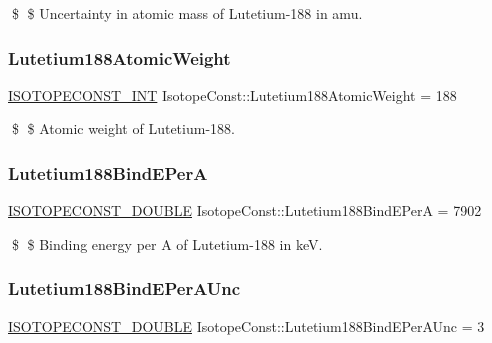 \$ \$ Uncertainty in atomic mass of Lutetium-\/188 in amu. \mbox{\label{group___isotope_const-_lutetium-_lu188_ga161a963f5f7dd7cbfc8707144be4d8c8}} 
\subsubsection{\texorpdfstring{Lutetium188\+Atomic\+Weight}{Lutetium188AtomicWeight}}
{\footnotesize\ttfamily \mbox{\hyperlink{group___isotope_const-_macros_ga5f18360b3e99483a35c32d789e62621c}{I\+S\+O\+T\+O\+P\+E\+C\+O\+N\+S\+T\+\_\+\+I\+NT}} Isotope\+Const\+::\+Lutetium188\+Atomic\+Weight = 188}

\$ \$ Atomic weight of Lutetium-\/188. \mbox{\label{group___isotope_const-_lutetium-_lu188_ga67b99bdd00e783956f625c1250739a5e}} 
\subsubsection{\texorpdfstring{Lutetium188\+Bind\+E\+PerA}{Lutetium188BindEPerA}}
{\footnotesize\ttfamily \mbox{\hyperlink{group___isotope_const-_macros_ga8f45a7272ce02c0b4c65c44636ed719a}{I\+S\+O\+T\+O\+P\+E\+C\+O\+N\+S\+T\+\_\+\+D\+O\+U\+B\+LE}} Isotope\+Const\+::\+Lutetium188\+Bind\+E\+PerA = 7902}

\$ \$ Binding energy per A of Lutetium-\/188 in keV. \mbox{\label{group___isotope_const-_lutetium-_lu188_ga04f88137c8fcff6f53e3dde758d5ff02}} 
\subsubsection{\texorpdfstring{Lutetium188\+Bind\+E\+Per\+A\+Unc}{Lutetium188BindEPerAUnc}}
{\footnotesize\ttfamily \mbox{\hyperlink{group___isotope_const-_macros_ga8f45a7272ce02c0b4c65c44636ed719a}{I\+S\+O\+T\+O\+P\+E\+C\+O\+N\+S\+T\+\_\+\+D\+O\+U\+B\+LE}} Isotope\+Const\+::\+Lutetium188\+Bind\+E\+Per\+A\+Unc = 3}


